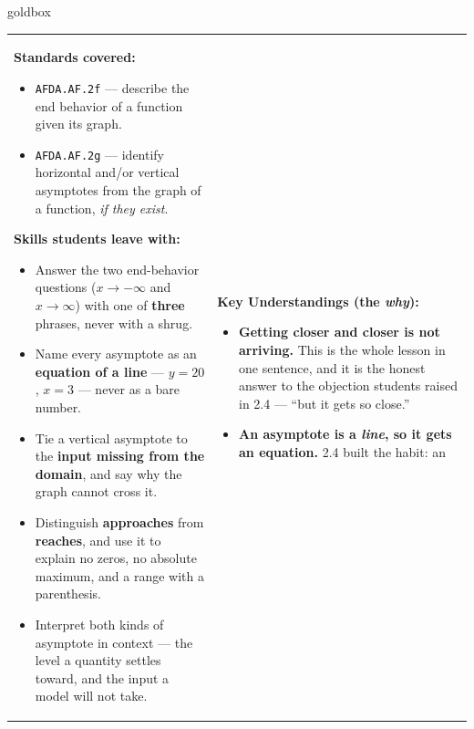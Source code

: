 \documentclass[10pt]{article}
\begin{document}
\renewcommand{\arraystretch}{1.6}
\begin{skillbox}{goldbox}
\begin{tabularx}{\linewidth}{@{}X|X@{}}
\begin{minipage}[t]{\linewidth}\vspace{0pt}
\textbf{Standards covered:}
\begin{itemize}[leftmargin=1.1em, itemsep=2pt, topsep=2pt]
  \item \texttt{AFDA.AF.2f} --- describe the end behavior of a function given its graph.
  \item \texttt{AFDA.AF.2g} --- identify horizontal and/or vertical asymptotes from the graph of a
        function, \emph{if they exist}.
\end{itemize}
\textbf{Skills students leave with:}
\begin{itemize}[leftmargin=1.1em, itemsep=2pt, topsep=2pt]
  \item Answer the two end-behavior questions ($x \to -\infty$ and $x \to \infty$) with one of
        \textbf{three} phrases, never with a shrug.
  \item Name every asymptote as an \textbf{equation of a line} --- $y=20$, $x=3$ --- never as a bare
        number.
  \item Tie a vertical asymptote to the \textbf{input missing from the domain}, and say why the graph
        cannot cross it.
  \item Distinguish \textbf{approaches} from \textbf{reaches}, and use it to explain no zeros, no
        absolute maximum, and a range with a parenthesis.
  \item Interpret both kinds of asymptote in context --- the level a quantity settles toward, and the
        input a model will not take.
\end{itemize}
\end{minipage}
&
\begin{minipage}[t]{\linewidth}\vspace{0pt}
\textbf{Key Understandings (the \emph{why}):}
\begin{itemize}[leftmargin=1.1em, itemsep=2pt, topsep=2pt]
  \item \textbf{Getting closer and closer is not arriving.} This is the whole lesson in one sentence,
        and it is the honest answer to the objection students raised in 2.4 --- ``but it gets so
        close.''
  \item \textbf{An asymptote is a \emph{line}, so it gets an equation.} 2.4 built the habit: an

\end{itemize}
\end{minipage}
\end{tabularx}
\end{skillbox}
\end{document}
